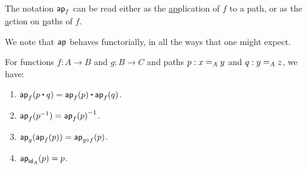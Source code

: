 \documentclass[hott-all.tex]{subfiles}
\begin{document}
The notation $\apfunc f$ can be read either as the \underline{ap}plication of $f$ to a path, or as the \underline{a}ction on \underline{p}aths of $f$.

%
%
%
We note that $\apfunc{}$ behaves functorially, in all the ways that one might expect.

\begin{lem}\label{lem:ap-functor}
  For functions $f:A\to B$ and $g:B\to C$ and paths $p:\id[A]xy$ and $q:\id[A]yz$, we have:
  \begin{enumerate}
  \item $\apfunc f(p\ct q) = \apfunc f(p) \ct \apfunc f(q)$.\label{item:apfunctor-ct}
  \item $\apfunc f(\opp p) = \opp{\apfunc f (p)}$.\label{item:apfunctor-opp}
  \item $\apfunc g (\apfunc f(p)) = \apfunc{g\circ f} (p)$.\label{item:apfunctor-compose}
  \item $\apfunc {\idfunc[A]} (p) = p$.
  \end{enumerate}
\end{lem}

\end{document}
